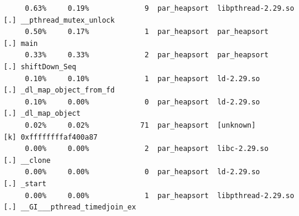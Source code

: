 \documentclass{article}
\begin{document}
\begin{verbatim}
     0.63%     0.19%             9  par_heapsort  libpthread-2.29.so  [.] __pthread_mutex_unlock
     0.50%     0.17%             1  par_heapsort  par_heapsort        [.] main
     0.33%     0.33%             2  par_heapsort  par_heapsort        [.] shiftDown_Seq
     0.10%     0.10%             1  par_heapsort  ld-2.29.so          [.] _dl_map_object_from_fd
     0.10%     0.00%             0  par_heapsort  ld-2.29.so          [.] _dl_map_object
     0.02%     0.02%            71  par_heapsort  [unknown]           [k] 0xffffffffaf400a87
     0.00%     0.00%             2  par_heapsort  libc-2.29.so        [.] __clone
     0.00%     0.00%             0  par_heapsort  ld-2.29.so          [.] _start
     0.00%     0.00%             1  par_heapsort  libpthread-2.29.so  [.] __GI___pthread_timedjoin_ex
\end{verbatim}
\normalsize
\end{document}
